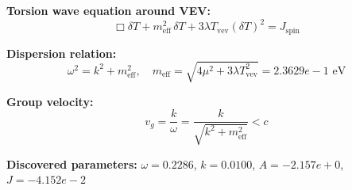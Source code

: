 
\textbf{Torsion wave equation around VEV:}
\begin{equation}
  \Box \delta T + m_{\text{eff}}^2 \, \delta T + 3\lambda T_{\text{vev}} (\delta T)^2 = J_{\text{spin}}
\end{equation}

\textbf{Dispersion relation:}
\begin{equation}
  \omega^2 = k^2 + m_{\text{eff}}^2, \quad
  m_{\text{eff}} = \sqrt{4\mu^2 + 3\lambda T_{\text{vev}}^2} = 2.3629e-1 \text{ eV}
\end{equation}

\textbf{Group velocity:}
\begin{equation}
  v_g = \frac{k}{\omega} = \frac{k}{\sqrt{k^2 + m_{\text{eff}}^2}} < c
\end{equation}

\textbf{Discovered parameters:}
$\omega = 0.2286$, \quad
$k = 0.0100$, \quad
$A = -2.157e+0$, \quad
$J = -4.152e-2$